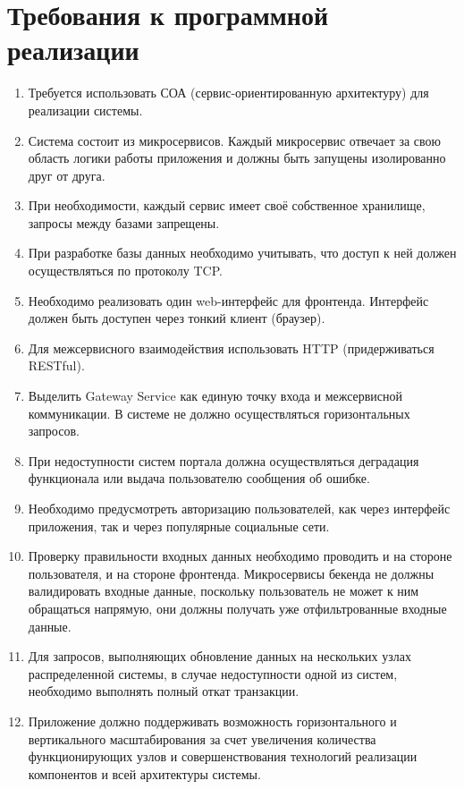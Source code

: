 \section*{Требования к программной реализации}
\begin{enumerate}
	\item Требуется использовать СОА (сервис-ориентированную архитектуру) для реализации системы.
	
	\item Система состоит из микросервисов. Каждый микросервис отвечает за свою область логики работы приложения и должны быть запущены изолированно друг от друга.
	
	\item При необходимости, каждый сервис имеет своё собственное хранилище,  запросы между базами запрещены.
	
	\item При разработке базы данных необходимо учитывать, что доступ к ней должен осуществляться по протоколу TCP.
	
	\item Необходимо  реализовать  один  web-интерфейс  для  фронтенда.  Интерфейс  должен  быть  доступен  через  тонкий  клиент (браузер).
	
	\item Для межсервисного взаимодействия использовать HTTP (придерживаться RESTful).
	
	\item Выделить Gateway Service как единую точку входа и межсервисной коммуникации. В системе не должно осуществляться горизонтальных запросов.
	
	\item При недоступности систем портала должна осуществляться деградация	функционала или выдача пользователю сообщения об ошибке.
	
	\item Необходимо предусмотреть авторизацию пользователей, как через интерфейс приложения, так и через популярные социальные сети.
	
	\item Проверку правильности входных данных необходимо проводить и на стороне  пользователя,  и  на  стороне  фронтенда. Микросервисы бекенда не должны валидировать входные данные, поскольку пользователь не может к ним обращаться напрямую, они должны получать уже отфильтрованные входные данные.
	
	\item Для запросов, выполняющих обновление данных на нескольких узлах распределенной системы, в случае недоступности одной из систем, необходимо выполнять полный откат транзакции.
	
	\item Приложение должно поддерживать возможность горизонтального и вертикального масштабирования за счет увеличения количества функционирующих узлов и совершенствования технологий реализации компонентов и всей
	архитектуры системы.
	
\end{enumerate}

